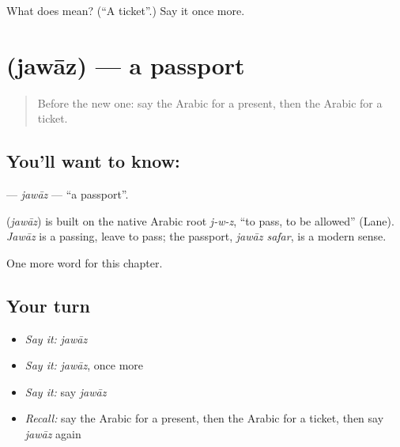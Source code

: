 \begin{tcolorbox}[breakable,colback=teal!4,colframe=teal!35!black,title={Before you move on}]
What does  mean? (\textquotedblleft{}A ticket\textquotedblright{}.) Say it once more.
\end{tcolorbox}
\section[\texorpdfstring{\ar{جواز} (jawāz)}{جواز (jawāz)}]{ (jawāz) — a passport}

\label{lesson:AR-C118-jawaz}



\begin{quote}
Before the new one: say the Arabic for a present, then the Arabic for a ticket.
\end{quote}

\subsection*{You'll want to know: }
\textbf{} — \emph{jawāz} — \textquotedblleft{}a passport\textquotedblright{}.

\begin{cousinweb}
\textbf{} (\emph{jawāz}) is built on the native Arabic root \emph{j-w-z}, \textquotedblleft{}to pass, to be allowed\textquotedblright{} (Lane). \emph{Jawāz} is a passing, leave to pass; the passport, \emph{jawāz safar}, is a modern sense.
\end{cousinweb}

\begin{grammarlens}[title={What you've built}]
One more word for this chapter.
\end{grammarlens}

\subsection*{Your turn}
\begin{itemize}
\raggedright
  \item \emph{Say it:} \emph{jawāz}
  \item \emph{Say it:} \emph{jawāz}, once more
  \item \emph{Say it:} say \emph{jawāz}
  \item \emph{Recall:} say the Arabic for a present, then the Arabic for a ticket, then say \emph{jawāz} again
\end{itemize}

